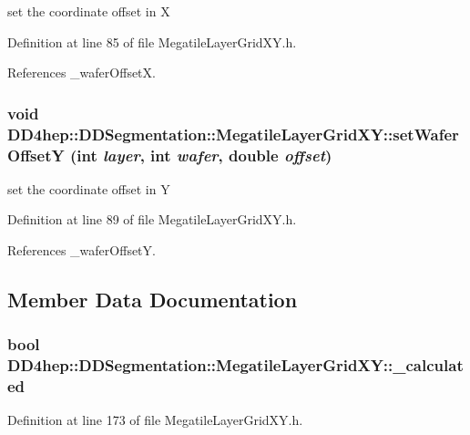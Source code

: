 set the coordinate offset in X 

Definition at line 85 of file MegatileLayerGridXY.h.

References \_\-waferOffsetX.\hypertarget{class_d_d4hep_1_1_d_d_segmentation_1_1_megatile_layer_grid_x_y_a4c17519c8f2abe47ea3b2a6d534871fa}{
\subsubsection[{setWaferOffsetY}]{\setlength{\rightskip}{0pt plus 5cm}void DD4hep::DDSegmentation::MegatileLayerGridXY::setWaferOffsetY (int {\em layer}, \/  int {\em wafer}, \/  double {\em offset})}}
\label{class_d_d4hep_1_1_d_d_segmentation_1_1_megatile_layer_grid_x_y_a4c17519c8f2abe47ea3b2a6d534871fa}


set the coordinate offset in Y 

Definition at line 89 of file MegatileLayerGridXY.h.

References \_\-waferOffsetY.

\subsection{Member Data Documentation}
\hypertarget{class_d_d4hep_1_1_d_d_segmentation_1_1_megatile_layer_grid_x_y_a3330c7077781b90cd4d8a780de205960}{
\subsubsection[{\_\-calculated}]{\setlength{\rightskip}{0pt plus 5cm}bool {\bf DD4hep::DDSegmentation::MegatileLayerGridXY::\_\-calculated}}}
\label{class_d_d4hep_1_1_d_d_segmentation_1_1_megatile_layer_grid_x_y_a3330c7077781b90cd4d8a780de205960}


Definition at line 173 of file MegatileLayerGridXY.h.

